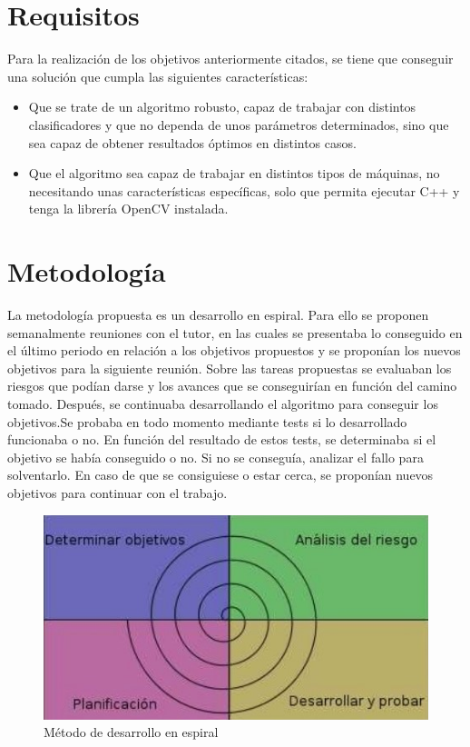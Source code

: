\section{Requisitos}
Para la realizaci\'on de los objetivos anteriormente citados, se tiene que conseguir una soluci\'on que cumpla las siguientes caracter\'isticas:
\begin{itemize}
\item Que se trate de un algoritmo robusto, capaz de trabajar con distintos clasificadores y que no dependa de unos parámetros determinados, sino que sea capaz de obtener resultados óptimos en distintos casos.

\item Que el algoritmo sea capaz de trabajar en distintos tipos de máquinas, no necesitando unas características específicas, solo que permita ejecutar C++ y tenga la librería OpenCV instalada.

\end{itemize}

\section{Metodolog\'ia}

La metodología propuesta es un desarrollo en espiral. Para ello se proponen semanalmente reuniones con el tutor, en las cuales se presentaba lo conseguido en el último periodo en relación a los objetivos propuestos y se proponían los nuevos objetivos para la siguiente reunión. Sobre las tareas propuestas se evaluaban los riesgos que podían darse y los avances que se conseguirían en función del camino tomado. Después, se continuaba desarrollando el algoritmo para conseguir los objetivos.Se probaba en todo momento mediante tests si lo desarrollado funcionaba o no. En función del resultado de estos tests, se determinaba si el objetivo se había conseguido o no. Si no se conseguía, analizar el fallo para solventarlo. En caso de que se consiguiese o estar cerca, se proponían nuevos objetivos para continuar con el trabajo.

\begin{figure}[H]
	\centering
		\includegraphics{imgs/metodologia-espiral.jpg}
        \caption{M\'etodo de desarrollo en espiral}
	\label{fig:Desarrollo en espiral}
\end{figure}

